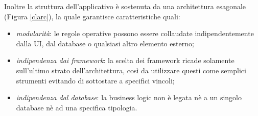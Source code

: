 Inoltre la struttura dell'applicativo è sostenuta da una architettura esagonale (Figura \ref*{clarc}), la quale garantisce caratteristiche quali:
\begin{itemize}
    \item \textit{modularità}: le regole operative possono essere collaudate indipendentemente dalla UI, dal database o qualsiasi altro elemento esterno;
    \item \textit{indipendenza dai framework}: la scelta dei framework ricade solamente sull'ultimo strato dell'architettura, così da utilizzare questi come semplici strumenti evitando di sottostare a specifici vincoli;
    \item \textit{indipendenza dal database}: la business logic non è legata nè a un singolo database nè ad una specifica tipologia.
\end{itemize}

